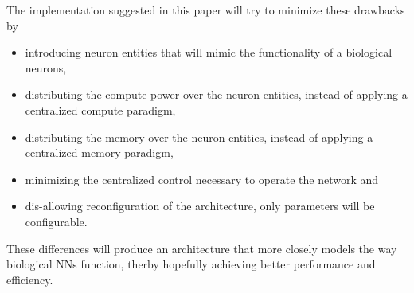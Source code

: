 The implementation suggested in this paper will try to minimize these drawbacks by
\begin{itemize}
  \item introducing neuron entities that will mimic the functionality of a biological neurons,
  \item distributing the compute power over the neuron entities, instead of applying a centralized compute paradigm,
  \item distributing the memory over the neuron entities, instead of applying a centralized memory paradigm,
  \item minimizing the centralized control necessary to operate the network and
  \item dis-allowing reconfiguration of the architecture, only parameters will be configurable.
\end{itemize}
These differences will produce an architecture that more closely models the way biological \acfp{NN} function, therby hopefully achieving better performance and efficiency.
